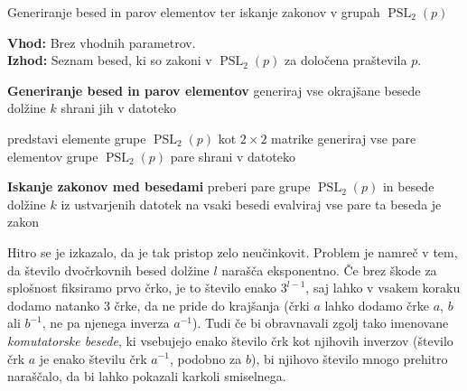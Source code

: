 \begin{algorithm}[ht]
    \caption{Generiranje besed in parov elementov ter iskanje zakonov v grupah \( \operatorname{PSL}_2(p) \)}
    \label{alg_preverjanje_zakonov}
    \raggedright
    \textbf{Vhod:} Brez vhodnih parametrov. \\
    \textbf{Izhod:} Seznam besed, ki so zakoni v \( \operatorname{PSL}_2(p) \) za določena praštevila \( p \).
  
    \begin{algorithmic}[1]
      \State \textbf{Generiranje besed in parov elementov}
        \State generiraj vse okrajšane besede dolžine $k$
        \State shrani jih v datoteko
      \EndFor
      
        \State predstavi elemente grupe \( \operatorname{PSL}_2(p) \) kot $2 \times 2$ matrike
        \State generiraj vse pare elementov grupe \( \operatorname{PSL}_2(p) \)
        \State pare shrani v datoteko
      \EndFor
  
      \State \textbf{Iskanje zakonov med besedami}
          \State preberi pare grupe \( \operatorname{PSL}_2(p) \) in besede dolžine $k$ iz ustvarjenih datotek
          \State na vsaki besedi evalviraj vse pare
            \State ta beseda je zakon
          \EndIf
        \EndFor
      \EndFor
    \end{algorithmic}
  \end{algorithm}
Hitro se je izkazalo, da je tak pristop zelo neučinkovit. Problem je namreč v tem, da število dvočrkovnih besed dolžine $l$ narašča eksponentno. Če brez škode za splošnost fiksiramo prvo črko, je to število enako $3^{l - 1}$,
saj lahko v vsakem koraku dodamo natanko 3 črke, da ne pride do krajšanja (črki $a$ lahko dodamo črke $a$, $b$ ali $b^{-1}$, ne pa njenega inverza $a^{-1}$). Tudi če bi obravnavali zgolj tako imenovane \emph{komutatorske besede}, ki vsebujejo enako število črk kot njihovih inverzov (število črk $a$ je enako številu črk $a^{-1}$, podobno za $b$),
bi njihovo število mnogo prehitro naraščalo, da bi lahko pokazali karkoli smiselnega.


